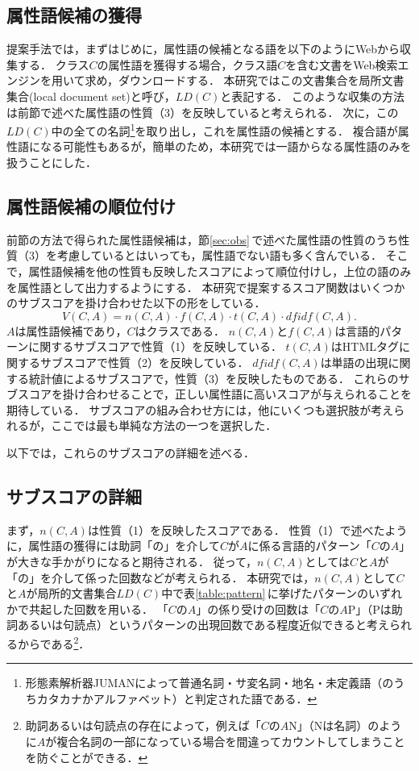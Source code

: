 \subsection{属性語候補の獲得}
提案手法では，まずはじめに，属性語の候補となる語を以下のようにWebから収集する．
クラス$C$の属性語を獲得する場合，クラス語$C$を含む文書をWeb検索エンジンを用いて求め，ダウンロードする．
本研究ではこの文書集合を局所文書集合(local document set)と呼び，$LD(C)$と表記する． 
このような収集の方法は前節で述べた属性語の性質（3）を反映していると考えられる．
次に，この$LD(C)$中の全ての名詞\footnote{形態素解析器JUMAN\cite{JUMAN_eng}によって普通名詞・サ変名詞・地名・未定義語（のうちカタカナかアルファベット）と判定された語である．}を取り出し，これを属性語の候補とする．
複合語が属性語になる可能性もあるが，簡単のため，本研究では一語からなる属性語のみを扱うことにした． 


\subsection{属性語候補の順位付け}
前節の方法で得られた属性語候補は，節\ref{sec:obs}\,で述べた属性語の性質のうち性質（3）を考慮しているとはいっても，属性語でない語も多く含んでいる．
そこで，属性語候補を他の性質も反映したスコアによって順位付けし，上位の語のみを属性語として出力するようにする．
本研究で提案するスコア関数はいくつかのサブスコアを掛け合わせた以下の形をしている．
\begin{equation}
V(C,A) = n(C,A)\cdot f(C,A)\cdot  t(C,A)\cdot dfidf(C,A).
\label{eq:score}
\end{equation}
$A$は属性語候補であり，$C$はクラスである．
$n(C,A)$と$f(C,A)$は言語的パターンに関するサブスコアで性質（1）を反映している．
$t(C,A)$はHTMLタグに関するサブスコアで性質（2）を反映している． 
$dfidf(C,A)$は単語の出現に関する統計値によるサブスコアで，性質（3）を反映したものである．
これらのサブスコアを掛け合わせることで，正しい属性語に高いスコアが与えられることを期待している．
サブスコアの組み合わせ方には，他にいくつも選択肢が考えられるが，ここでは最も単純な方法の一つを選択した． 

以下では，これらのサブスコアの詳細を述べる．

\subsection{サブスコアの詳細}
まず，$n(C,A)$は性質（1）を反映したスコアである． 
性質（1）で述べたように，属性語の獲得には助詞「の」を介して$C$が$A$に係る言語的パターン「$C$の$A$」が大きな手かがりになると期待される．
従って，$n(C,A)$としては$C$と$A$が「の」を介して係った回数などが考えられる．
本研究では，$n(C,A)$として$C$と$A$が局所的文書集合$LD(C)$中で表\ref{table:pattern}\,に挙げたパターンのいずれかで共起した回数を用いる．
「$C$の$A$」の係り受けの回数は「$C$の$A${\sf P}」（{\sf P}は助詞あるいは句読点）というパターンの出現回数である程度近似できると考えられるからである\footnote{助詞あるいは句読点の存在によって，例えば「$C$の$A${\sf N}」（{\sf N}は名詞）のように$A$が複合名詞の一部になっている場合を間違ってカウントしてしまうことを防ぐことができる．}．

